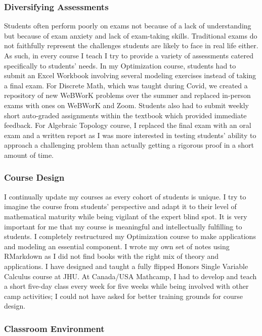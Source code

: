 \documentclass[
]{report}
\begin{document}
\hypertarget{diversifying-assessments}{%
\subsubsection*{Diversifying Assessments}\label{diversifying-assessments}}


Students often perform poorly on exams not because of a lack of understanding but because of exam anxiety and lack of exam-taking skills.
Traditional exams do not faithfully represent the challenges students are likely to face in real life either.
As such, in every course I teach I try to provide a variety of assessments catered specifically to students' needs. In my Optimization course, students had to submit an Excel Workbook involving several modeling exercises instead of taking a final exam. For Discrete Math, which was taught during Covid, we created a repository of new WeBWorK problems over the summer and replaced in-person exams with ones on WeBWorK and Zoom. Students also had to submit weekly short auto-graded assignments within the textbook which provided immediate feedback. For Algebraic Topology course, I replaced the final exam with an oral exam and a written report as I was more interested in testing students' ability to approach a challenging problem than actually getting a rigorous proof in a short amount of time.

\hypertarget{course-design}{%
\subsubsection*{Course Design}\label{course-design}}


I continually update my courses as every cohort of students is unique.
I try to imagine the course from students' perspective and adapt it to their level of mathematical maturity while being vigilant of the expert blind spot.
It is very important for me that my course is meaningful and intellectually fulfilling to students.
I completely restructured my Optimization course to make applications and modeling an essential component.
I wrote my own set of notes using RMarkdown as I did not find books with the right mix of theory and applications.
I have designed and taught a fully flipped Honors Single Variable Calculus course at JHU.
At Canada/USA Mathcamp, I had to develop and teach a short five-day class every week for five weeks while being involved with other camp activities;
I could not have asked for better training grounds for course design.

\hypertarget{classroom-environment}{%
\subsubsection*{Classroom Environment}\label{classroom-environment}}
\end{document}
